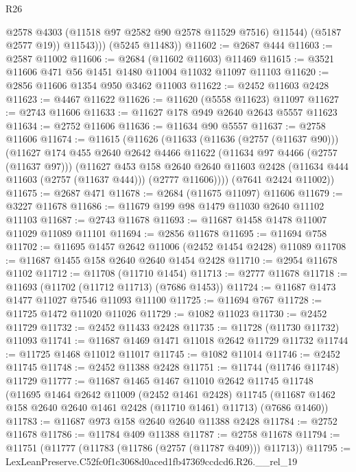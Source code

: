 \begin{lexlean}{R26}
\begin{coremodule}
                @2578
                @4303
                (@11518 @97 @2582 @90 @2578 @11529 @7516)
                @11544)
              (@5187 @2577 @19))
            @11543)))
      (@5245 @11483))
@11602 := @2687 @444
@11603 := @2587 @11002
@11606 := @2684 (@11602 @11603) @11469
@11615 := @3521 @11606 @471 @56 @1451 @1480 @11004 @11032 @11097 @11103
@11620 := @2856 @11606 @1354 @950 @3462 @11003
@11622 := @2452 @11603 @2428
@11623 := @4467 @11622
@11626 := @11620 (@5558 @11623) @11097
@11627 := @2743 @11606
@11633 := @11627 @178 @949 @2640 @2643 @5557 @11623
@11634 := @2752 @11606
@11636 := @11634 @90 @5557
@11637 := @2758 @11606
@11674 := @11615
    (@11626
      (@11633
        (@11636 (@2757 (@11637 @90)))
        (@11627
          @174
          @455
          @2640
          @2642
          @4466
          @11622
          (@11634 @97 @4466 (@2757 (@11637 @97)))
          (@11627
            @453
            @158
            @2640
            @2640
            @11603
            @2428
            (@11634 @444 @11603 (@2757 (@11637 @444)))
            (@2777 @11606))))
      (@7641 @2424 @11002))
@11675 := @2687 @471
@11678 := @2684 (@11675 @11097) @11606
@11679 := @3227 @11678
@11686 := @11679 @199 @98 @1479 @11030 @2640 @11102 @11103
@11687 := @2743 @11678
@11693 := @11687 @1458 @1478 @11007 @11029 @11089 @11101
@11694 := @2856 @11678
@11695 := @11694 @758
@11702 := @11695 @1457 @2642 @11006 (@2452 @1454 @2428) @11089
@11708 := @11687 @1455 @158 @2640 @2640 @1454 @2428
@11710 := @2954 @11678 @1102
@11712 := @11708 (@11710 @1454)
@11713 := @2777 @11678
@11718 := @11693 (@11702 (@11712 @11713) (@7686 @1453))
@11724 := @11687 @1473 @1477 @11027 @7546 @11093 @11100
@11725 := @11694 @767
@11728 := @11725 @1472 @11020 @11026
@11729 := @1082 @11023
@11730 := @2452 @11729
@11732 := @2452 @11433 @2428
@11735 := @11728 (@11730 @11732) @11093
@11741 := @11687 @1469 @1471 @11018 @2642 @11729 @11732
@11744 := @11725 @1468 @11012 @11017
@11745 := @1082 @11014
@11746 := @2452 @11745
@11748 := @2452 @11388 @2428
@11751 := @11744 (@11746 @11748) @11729
@11777 := @11687
    @1465
    @1467
    @11010
    @2642
    @11745
    @11748
    (@11695
      @1464
      @2642
      @11009
      (@2452 @1461 @2428)
      @11745
      (@11687 @1462 @158 @2640 @2640 @1461 @2428 (@11710 @1461) @11713)
      (@7686 @1460))
@11783 := @11687 @973 @158 @2640 @2640 @11388 @2428
@11784 := @2752 @11678
@11786 := @11784 @409 @11388
@11787 := @2758 @11678
@11794 := @11751 (@11777 (@11783 (@11786 (@2757 (@11787 @409))) @11713))
@11795 := LexLeanPreserve.C52fc0f1c3068d0aced1fb47369ccdcd6.R26.__rel_19

\end{coremodule}
\end{lexlean}
